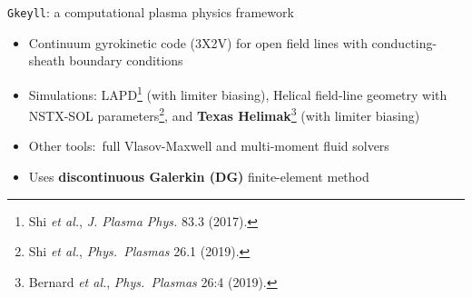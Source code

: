\documentclass[12pt,table]{beamer}
\newcommand{\etal}{\emph{et al.}}
\newcommand{\gke}{{\tt Gkeyll}}
\begin{document}
\begin{frame}{\gke: a computational plasma physics framework}
    \begin{itemize}
        \item Continuum gyrokinetic code (3X2V) for open field lines with conducting-sheath boundary conditions
        \item Simulations: LAPD\footnote{\scriptsize Shi \etal, \emph{J. Plasma Phys.} 83.3 (2017).} (with limiter biasing), Helical field-line geometry with NSTX-SOL parameters\footnote{\scriptsize Shi \etal, \emph{Phys.~Plasmas} 26.1 (2019).}, and {\bf Texas Helimak}\footnote{\scriptsize Bernard \etal, \emph{Phys.~Plasmas} 26:4 (2019).} (with limiter biasing)
        \item Other tools:~full Vlasov-Maxwell and multi-moment fluid solvers
        \item Uses {\bf discontinuous Galerkin (DG)} finite-element method
    \end{itemize}
\end{frame}
\end{document}
